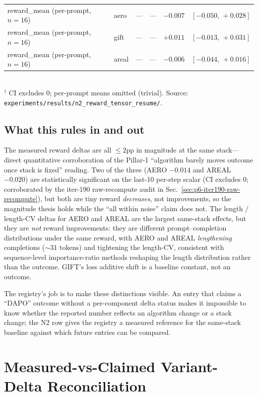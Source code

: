 \documentclass{article}
\begin{document}
\begin{table}[t]
\begin{tabular}{lllrrr}
\midrule
reward\_mean (per-prompt, $n{=}16$) & aero  & --- & --- & $-0.007$ & $[-0.050,\,+0.028]$ \\
reward\_mean (per-prompt, $n{=}16$) & gift  & --- & --- & $+0.011$ & $[-0.013,\,+0.031]$ \\
reward\_mean (per-prompt, $n{=}16$) & areal & --- & --- & $-0.006$ & $[-0.044,\,+0.016]$ \\
\bottomrule
\end{tabular}\\
\footnotesize{$^{\dagger}$ CI excludes $0$; per-prompt means omitted
(trivial). Source: \texttt{experiments/results/n2\_reward\_tensor\_resume/}.
}
\end{table}

\subsection{What this rules in and out}
The measured reward deltas are all $\leq 2$pp in magnitude at the same
stack---direct quantitative corroboration of the Pillar-1 ``algorithm
barely moves outcome once stack is fixed'' reading. Two of the three
(AERO $-0.014$ and AREAL $-0.020$) are statistically significant on the
last-10 per-step scalar (CI excludes $0$; corroborated by the iter-190
raw-recompute audit in Sec.~\ref{sec:p6-iter190-raw-recompute}), but both are tiny
reward \emph{decreases}, not improvements, so the magnitude thesis holds
while the ``all within noise'' claim does not. The length / length-CV
deltas for AERO and AREAL are the largest same-stack effects, but they
are \emph{not} reward improvements: they are different
prompt--completion distributions under the same reward, with AERO and
AREAL \emph{lengthening} completions ($\sim$31 tokens) and tightening
the length-CV, consistent with sequence-level importance-ratio methods
reshaping the length distribution rather than the outcome. GIFT's loss
additive shift is a baseline constant, not an outcome.

The registry's job is to make these distinctions visible. An entry that
claims a ``DAPO'' outcome without a per-component delta status makes it
impossible to know whether the reported number reflects an algorithm
change or a stack change; the N2 row gives the registry a measured
reference for the same-stack baseline against which future entries can
be compared. \section{Measured-vs-Claimed Variant-Delta Reconciliation}
\label{sec:p6-measured-claimed}
\end{document}
